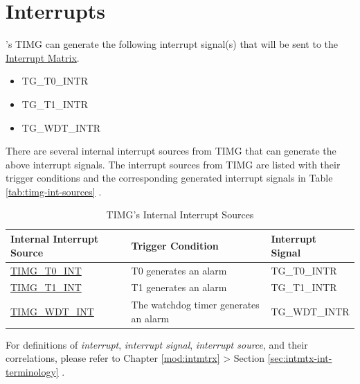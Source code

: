 \documentclass[main\_\_EN.tex]{subfiles}
\begin{document}
\section{Interrupts}
\label{sec:timg-interrupt}

\chipname{}'s TIMG can generate the following interrupt signal(s) that will be sent to the \hyperref[mod:intmtrx]{Interrupt Matrix}.

    \begin{itemize}
        \item TG\_T0\_INTR
        \item TG\_T1\_INTR
        \item TG\_WDT\_INTR
    \end{itemize}

There are several internal interrupt sources from TIMG that can generate the above interrupt signals. The interrupt sources from TIMG are listed with their trigger conditions and the corresponding generated interrupt signals in Table \ref{tab:timg-int-sources} \textit{}.

\begin{longtable}{ | L{5cm} | L{6.5cm} | L{4cm} | }
\caption{TIMG's Internal Interrupt Sources}
\label{tab:timg-int-sources}
\\ \hline
{}
\textbf{Internal Interrupt Source} & \textbf{Trigger Condition}  &  \textbf{Interrupt Signal}\\ \hline
\label{int:TIMGT0INT}\hyperref[int:TIMGT0INT]{TIMG\_T0\_INT}  &  T0 generates an alarm &  TG\_T0\_INTR  \\ \hline
\label{int:TIMGT1INT}\hyperref[int:TIMGT1INT]{TIMG\_T1\_INT}  &  T1 generates an alarm &  TG\_T1\_INTR  \\ \hline
\label{int:TIMGWDTINT}\hyperref[int:TIMGWDTINT]{TIMG\_WDT\_INT} &  The watchdog timer generates an alarm & TG\_WDT\_INTR \\ \hline
\end{longtable}

\begin{tiplisting}
For definitions of \textit{interrupt}, \textit{interrupt signal}, \textit{interrupt source}, and their correlations, please refer to Chapter \ref{mod:intmtrx} \textit{} > Section \ref{sec:intmtx-int-terminology} \textit{}.
\end{tiplisting}
\end{document}
